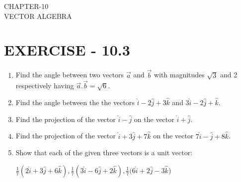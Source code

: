 \documentclass[12pt]{article}
\begin{document}
\begin{center}
\textbf\large{CHAPTER-10 \\ VECTOR ALGEBRA}
\end{center}

\section{EXERCISE - 10.3}
\begin{enumerate}
		\fi
\begin{enumerate}[label=\thesection.\arabic*,ref=\thesection.\theenumi]
\item Find the angle between two vectors $\overrightarrow{a}$ and $\overrightarrow {b} $ with magnitudes $\sqrt{3}$ and 2 respectively having $\overrightarrow {a}.\overrightarrow {b}=\sqrt{6}$.
	\\
	\solution
		
\item Find the angle between the the vectors $\hat{i}-2\hat{j}+3\hat{k}$ and $3\hat{i}-2\hat{j}+\hat{k}$.
\item Find the projection of the vector $\hat{i}-\hat{j}$ on the vector $\hat{i}+\hat{j}$.
	\\
		
\item Find the projection of the vector $\hat{i}+3\hat{j}+7\hat{k}$ on the vector $7\hat{i}-\hat{j}+8\hat{k}$.
\item Show that each of the given three vectors is a unit vector: 

 $\frac{1}{7}(2\hat{i}+3\hat{j}+6\hat{k}),\frac{1}{7}(3\hat{i}-6\hat{j}+2\hat{k}),\frac{1}{7}(6\hat{i}+2\hat{j}-3\hat{k}$)
 

\end{enumerate}
\end{enumerate}
\end{document}
